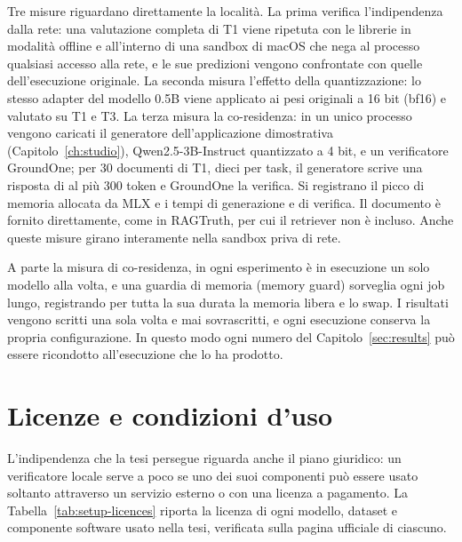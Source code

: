 Tre misure riguardano direttamente la località. La prima verifica l'indipendenza dalla rete: una valutazione completa di
T1 viene ripetuta con le librerie in modalità offline e all'interno di una sandbox di macOS che nega al processo
qualsiasi accesso alla rete, e le sue predizioni vengono confrontate con quelle dell'esecuzione originale. La seconda
misura l'effetto della quantizzazione: lo stesso adapter del modello 0.5B viene applicato ai pesi originali a 16 bit
(bf16) e valutato su T1 e T3. La terza misura la co-residenza: in un unico processo vengono caricati il generatore
dell'applicazione dimostrativa (Capitolo~\ref{ch:studio}), Qwen2.5-3B-Instruct quantizzato a 4 bit, e un verificatore GroundOne; per
30 documenti di T1, dieci per task, il generatore scrive una risposta di al più 300 token e GroundOne la verifica.
Si registrano il picco di memoria allocata da MLX e i tempi di generazione e di verifica. Il documento è fornito
direttamente, come in RAGTruth, per cui il retriever non è incluso. Anche queste misure girano interamente nella
sandbox priva di rete.

A parte la misura di co-residenza, in ogni esperimento è in esecuzione un solo modello alla volta, e una guardia di memoria (memory guard) sorveglia ogni
job lungo, registrando per tutta la sua durata la memoria libera e lo swap. I risultati vengono scritti una sola volta e
mai sovrascritti, e ogni esecuzione conserva la propria configurazione. In questo modo ogni numero del
Capitolo~\ref{sec:results} può essere ricondotto all'esecuzione che lo ha prodotto.

\section{Licenze e condizioni d'uso}
\label{sec:setup-licences}

L'indipendenza che la tesi persegue riguarda anche il piano giuridico: un verificatore locale serve a poco se uno dei
suoi componenti può essere usato soltanto attraverso un servizio esterno o con una licenza a pagamento. La
Tabella~\ref{tab:setup-licences} riporta la licenza di ogni modello, dataset e componente software usato nella tesi,
verificata sulla pagina ufficiale di ciascuno.

